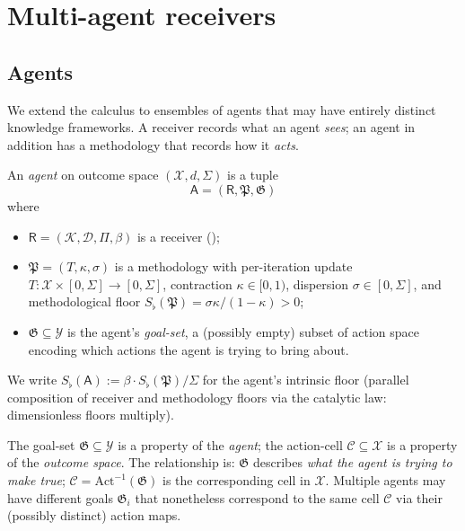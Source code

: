 \documentclass[11pt,twocolumn,a4paper]{article}
\newcommand{\K}{\mathcal{K}}
\newcommand{\D}{\mathcal{D}}
\newcommand{\X}{\mathcal{X}}
\newcommand{\Y}{\mathcal{Y}}
\newcommand{\Cell}{\mathcal{C}}
\newcommand{\Method}{\mathfrak{P}}
\newcommand{\Goal}{\mathfrak{G}}
\newcommand{\receiver}{\mathsf{R}}
\newcommand{\agent}{\mathsf{A}}
\newcommand{\Sfloor}{S_{\flat}}
\newcommand{\Action}{\mathrm{Act}}
\begin{document}
\section{Multi-agent receivers}
\label{sec:multi-agent}

\subsection{Agents}

We extend the calculus to ensembles of agents that may have entirely
distinct knowledge frameworks. A receiver records what an agent
\emph{sees}; an agent in addition has a methodology that records how
it \emph{acts}.

\begin{definition}[Agent]\label{def:agent}
An \emph{agent} on outcome space $(\X,d,\Sigma)$ is a tuple
\[
\agent=(\receiver,\Method,\Goal)
\]
where
\begin{itemize}[leftmargin=*]
\item $\receiver=(\K,\D,\Pi,\beta)$ is a receiver
();
\item $\Method=(T,\kappa,\sigma)$ is a methodology with
per-iteration update $T:\X\times[0,\Sigma]\to[0,\Sigma]$,
contraction $\kappa\in[0,1)$, dispersion $\sigma\in[0,\Sigma]$, and
methodological floor $\Sfloor(\Method)=\sigma\kappa/(1-\kappa)>0$;
\item $\Goal\subseteq\Y$ is the agent's \emph{goal-set}, a (possibly
empty) subset of action space encoding which actions the agent is
trying to bring about.
\end{itemize}
We write $\Sfloor(\agent):=\beta\cdot\Sfloor(\Method)/\Sigma$ for the
agent's intrinsic floor (parallel composition of receiver and
methodology floors via the catalytic law: dimensionless floors
multiply).
\end{definition}

\begin{remark}\label{rem:goal-vs-cell}
The goal-set $\Goal\subseteq\Y$ is a property of the \emph{agent}; the
action-cell $\Cell\subseteq\X$ is a property of the \emph{outcome
space}. The relationship is:
$\Goal$ describes \emph{what the agent is trying to make true};
$\Cell=\Action^{-1}(\Goal)$ is the corresponding cell in $\X$.
Multiple agents may have different goals $\Goal_i$ that nonetheless
correspond to the same cell $\Cell$ via their (possibly distinct)
action maps.
\end{remark}
\end{document}

